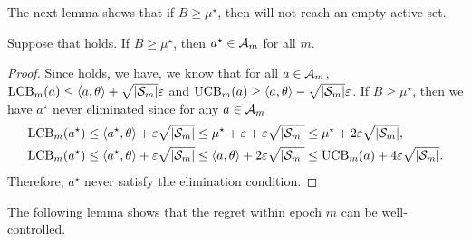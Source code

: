 The next lemma shows that if $B\geq \mu^\star$, then  will not reach an empty active set.
\begin{lemma}\label{lem:end-of-B}
    Suppose that  holds. If $B\geq \mu^\star$, then $a^\star\in {\mathcal{A}}_m$ for all $m$.
\end{lemma}
\begin{proof}
    Since  holds, we have, we know that for all $a\in{\mathcal{A}}_m$, ${\operatorname{LCB}}_m(a)\leq \left\langle {a,\theta} \right\rangle + \sqrt{|{\mathcal{S}}_m|}\varepsilon $ and ${\operatorname{UCB}}_m(a)\geq \left\langle {a,\theta} \right\rangle - \sqrt{|{\mathcal{S}}_m|}\varepsilon$. If $B\geq \mu^\star$, then we have $a^\star$ never eliminated since for any $a\in {\mathcal{A}}_m$
    \begin{align*}
        {\operatorname{LCB}}_{m}(a^\star) &\leq \left\langle {a^\star,\theta} \right\rangle + \varepsilon\sqrt{|{\mathcal{S}}_m|} \leq \mu^\star + \varepsilon + \varepsilon\sqrt{|{\mathcal{S}}_m|} \leq \mu^\star + 2\varepsilon\sqrt{|{\mathcal{S}}_m|},\\
        {\operatorname{LCB}}_{m}(a^\star) &\leq \left\langle {a^\star,\theta} \right\rangle + \varepsilon\sqrt{|{\mathcal{S}}_m|} \leq \left\langle {a,\theta} \right\rangle + 2\varepsilon\sqrt{|{\mathcal{S}}_m|} \leq {\operatorname{UCB}}_m(a) + 4\varepsilon\sqrt{|{\mathcal{S}}_m|}.
    \end{align*}
    Therefore, $a^\star$ never satisfy the elimination condition.
\end{proof}

The following lemma shows that the regret within epoch $m$ can be well-controlled.

